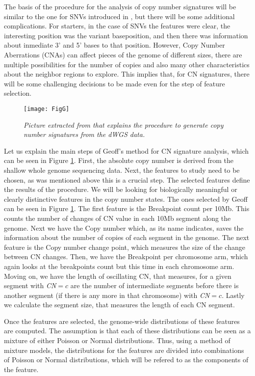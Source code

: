 \documentclass[a4paper]{article}
\begin{document}
The basis of the procedure for the analysis of copy number signatures will be similar to the one for SNVs introduced in \cite{Alex}, but there will be some additional complications. For starters, in the case of SNVs the features were clear, the interesting position was the variant baseposition, and then there was information about inmediate 3' and 5' bases to that position.  However, Copy Number Aberrations (CNAs) can affect pieces of the genome of different sizes, there are multiple possibilities for the number of copies and also many other characteristics about the neighbor regions to explore. This implies that, for CN signatures, there will be some challenging decisions to be made even for the step of feature selection.

\begin{figure}[h] 
	\centering
	\texttt{[image: FigG]} 
	\caption{\textit{Picture extracted from \cite{Geoff} that explains the procedure to generate copy number signatures from the dWGS data.}} \label{FigGeoffs}
\end{figure}

Let us explain the main steps of Geoff's method for CN signature analysis, which can be seen in Figure \ref{FigGeoffs}. First, the absolute copy number is derived from the shallow whole genome sequencing data. Next, the features to study need to be chosen, as was mentioned above this is a crucial step. The selected features define the results of the procedure. We will be looking for biologically meaningful or clearly distinctive features in the copy number states. The ones selected by Geoff can be seen in Figure \ref{FigGeoffs}. The first feature is the Breakpoint count per 10Mb. This  counts the number of changes of CN value in each 10Mb segment along the genome. Next we have the Copy number which, as its name indicates, saves the information about the number of copies of each segment in the genome. The next feature is the Copy number change point, which measures the size of the change between CN changes. Then, we have the Breakpoint per chromosome arm, which again looks at the breakpoints count but this time in each chromosome arm. Moving on, we have the length of oscillating CN, that measures, for a given segment with \textit{CN}$=c$ are the number of intermediate segments before there is another segment (if there is any more in that chromosome) with \textit{CN}$=c$. Lastly we calculate the segment size, that measures the length of each CN segment. 

Once the features are selected, the genome-wide distributions of these features are computed. The assumption is that each of these distributions can be seen as a mixture of either Poisson or Normal distributions. Thus, using a method of mixture models, the distributions for the features are divided into combinations of Poisson or Normal distributions, which will be refered to as the components of the feature. 
\end{document}
